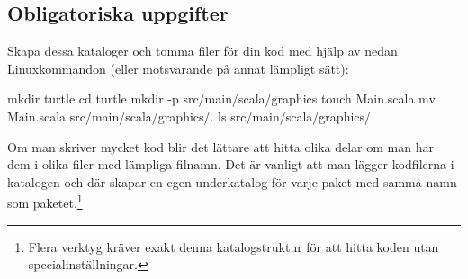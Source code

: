 %
%
%
%
%
%
%
%
%
%
%
%
%
%
%
%
%
%
%
%
%
%
%
%
%

\subsection{Obligatoriska uppgifter}


\Task Skapa dessa kataloger %
och tomma filer för din kod med hjälp av nedan Linuxkommandon (eller motsvarande på annat lämpligt sätt):
\begin{REPLnonum}
mkdir turtle
cd turtle
mkdir -p src/main/scala/graphics
touch Main.scala
mv Main.scala src/main/scala/graphics/.
ls src/main/scala/graphics/
\end{REPLnonum}
Om man skriver mycket kod blir det lättare att hitta olika delar om man har dem i olika filer med lämpliga  filnamn. Det är vanligt att man lägger kodfilerna i katalogen  och där skapar en egen underkatalog för varje paket med samma namn som paketet.\footnote{Flera verktyg kräver exakt denna katalogstruktur för att hitta koden utan specialinställningar.}


